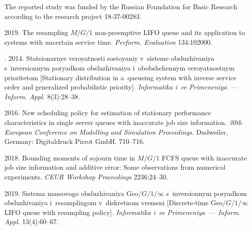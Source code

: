 \vspace*{-3pt}

\noindent
The reported study was funded by the Russian Foundation for
Basic Research according to the research project 18-37-00283.



 \begin{multicols}{2}

\renewcommand{\bibname}{\protect\rmfamily References}

{\small\frenchspacing
 {%
 \begin{thebibliography}{9}

 2019. The
resampling $M/G/1$ non-preemptive LIFO queue and its
application to systems with uncertain service time. \textit{Perform. 
Evaluation} 134:102000. 


. 2014. Statsionarnye veroyatnosti so\-sto\-yaniy v~sisteme 
obsluzhivaniya s~inversionnym
poryadkom obsluzhivaniya i~obobshchennym veroyatnostnym prioritetom 
[Stationary distribution in a~queueing
system with inverse service order and generalized probabilistic 
priority]. \textit{Informatika i~ee Primeneniya~--- Inform. Appl.} 
8(3):28--38.



 2016. New
scheduling policy for estimation of stationary performance
characteristics in single server queues with inaccurate job
size information. \textit{30th European Conference on Modelling
and Simulation Proceedings}. Dudweiler, Germany: Digitaldruck Pirrot 
GmbH. 710--716.

2018.
Bounding moments of sojourn time in $M/G/1$ FCFS queue with inaccurate job 
size information and additive error: Some observations from numerical 
experiments. \textit{CEUR Workshop Proceedings} 2236:24--30.

 2019. Sistema 
massovogo obsluzhivaniya Geo$/G/1/\infty$ s~inversionnym poryadkom 
obsluzhivaniya i~resamplingom v~diskretnom vremeni [Discrete-time 
Geo$/G/1/\infty$ LIFO queue with resampling policy].
\textit{Informatika i~ee Primeneniya~--- Inform. Appl.} 13(4):60--67.


\end{thebibliography}}}
\end{multicols}
